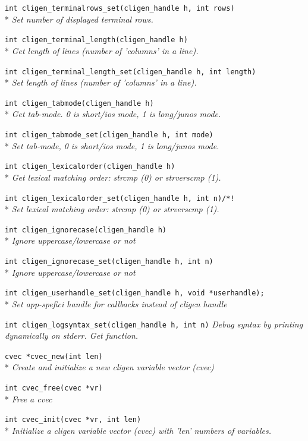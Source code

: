 \documentclass[a4paper, 10pt] {article}
\begin{document}
{\tt int  cligen\_terminalrows\_set(cligen\_handle h, int rows)}\\*
\emph{ Set number of displayed terminal rows.}

{\tt int cligen\_terminal\_length(cligen\_handle h)}\\*
\emph{ Get length of lines (number of 'columns' in a line).}

{\tt int  cligen\_terminal\_length\_set(cligen\_handle h, int length)}\\*
\emph{ Set length of lines (number of 'columns' in a line).}

{\tt int cligen\_tabmode(cligen\_handle h)}\\*
\emph{ Get tab-mode. 0 is short/ios mode, 1 is long/junos mode.}

{\tt int cligen\_tabmode\_set(cligen\_handle h, int mode)}\\*
\emph{ Set tab-mode, 0 is short/ios mode, 1 is long/junos mode.}

{\tt int cligen\_lexicalorder(cligen\_handle h)}\\*
\emph{ Get lexical matching order: strcmp (0) or strverscmp (1).}

{\tt int cligen\_lexicalorder\_set(cligen\_handle h, int n)/*! }\\*
\emph{ Set lexical matching order: strcmp (0) or strverscmp (1).}

{\tt int cligen\_ignorecase(cligen\_handle h)}\\*
\emph{ Ignore uppercase/lowercase or not}

{\tt int cligen\_ignorecase\_set(cligen\_handle h, int n)}\\*
\emph{ Ignore uppercase/lowercase or not}

{\tt int cligen\_userhandle\_set(cligen\_handle h, void *userhandle);}\\*
\emph{Set app-spefici handle for callbacks instead of cligen handle}

{\tt int cligen\_logsyntax\_set(cligen\_handle h, int n)}
\emph{Debug syntax by printing dynamically on stderr. Get function.}

{\tt cvec *cvec\_new(int len)}\\*
\emph{  Create and initialize a new cligen variable vector (cvec)}

{\tt int cvec\_free(cvec *vr)}\\*
\emph{ Free a cvec}

{\tt int cvec\_init(cvec *vr, int len)}\\*
\emph{ Initialize a cligen variable vector (cvec) with 'len' numbers of variables.}
\end{document}
